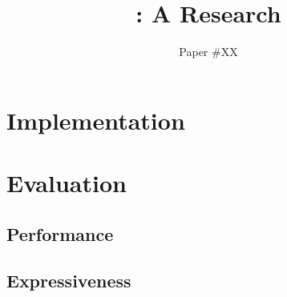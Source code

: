 \documentclass[letterpaper,twocolumn,10pt]{article}
\begin{document}

\date{}

\title{\Large \bf \name: A Research}

\author{
{\rm Paper \#XX}\\
} %

\maketitle

\begin{abstract}

\end{abstract}





\section{Implementation}
\section{Evaluation}
\subsection{Performance}
\subsection{Expressiveness}







\end{document}
